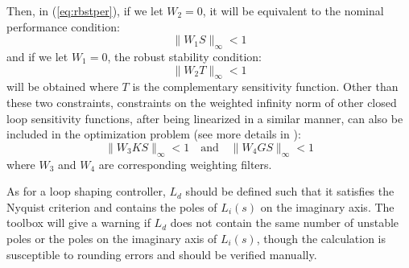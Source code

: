\documentclass [12pt , a4paper] {report}
\begin{document}
Then, in (\ref{eq:rbstper}), if we let $W_2=0$, it will be equivalent to the nominal performance condition: 
\begin{equation}
\label{eq:nomper}
\|W_1S\|_\infty<1
\end{equation}
and if we let $W_1=0$, the robust stability condition:
\begin{equation}
\label{eq:rbststab}
\|W_2T\|_\infty<1
\end{equation}
 will be obtained where $T$ is the complementary sensitivity function. Other than these two constraints, constraints on the weighted infinity norm of other closed loop sensitivity functions, after being linearized in a similar manner, can also be included in the optimization problem (see more details in \cite{KG10}):
\begin{equation}
\label{eq:W3W4}
\|W_3KS\|_\infty<1 \quad \mbox{and} \quad \|W_4GS\|_\infty<1 
\end{equation}
where $W_3$ and $W_4$ are corresponding weighting filters.


As for a loop shaping controller, $L_d$ should be defined such that it satisfies the Nyquist criterion and contains the poles of $L_i(s)$ on the imaginary axis. The toolbox will give a warning if $L_d$ does not contain the same number of unstable poles or the poles on the imaginary axis of $L_i(s)$, though the calculation is susceptible to rounding errors and should be verified manually.
\end{document}
